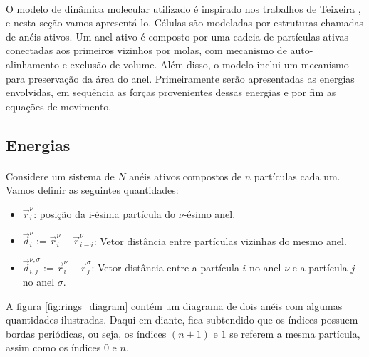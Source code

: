 \documentclass{article}
\theoremstyle{definition}
\def \quantity#1#2#3{\vec{#1}_{#2}^{#3}}
\def \quantityg#1#2#3#4#5{\vec{#1}_{#2, #3}^{#4, #5}}
\def \pos#1#2{\quantity{r}{#1}{#2}}
\def \desloc#1#2{\quantity{d}{#1}{#2}}
\begin{document}
\paragraph{}
O modelo de dinâmica molecular utilizado é inspirado nos trabalhos de Teixeira \cite{teixeira_single_2021}, \cite{teixeira_segregation_2024} e nesta seção vamos apresentá-lo. Células são modeladas por estruturas chamadas de anéis ativos. Um anel ativo é composto por uma cadeia de partículas ativas conectadas aos primeiros vizinhos por molas, com mecanismo de auto-alinhamento e exclusão de volume. Além disso, o modelo inclui um mecanismo para preservação da área do anel. Primeiramente serão apresentadas as energias envolvidas, em sequência as forças provenientes dessas energias e por fim as equações de movimento.

\subsection{Energias}
\paragraph{}
Considere um sistema de $N$ anéis ativos compostos de $n$ partículas cada um. Vamos definir as seguintes quantidades:

\begin{itemize}
    \item $\pos{i}{\nu}$: posição da i-ésima partícula do $\nu$-ésimo anel.
    \item $\desloc{i}{\nu} := \pos{i}{\nu} - \pos{i-i}{\nu}$: Vetor distância entre partículas vizinhas do mesmo anel.
    \item $\quantityg{d}{i}{j}{\nu}{\sigma} := \pos{i}{\nu} - \pos{j}{\sigma}$: Vetor distância entre a partícula $i$ no anel $\nu$ e a partícula $j$ no anel $\sigma$.
\end{itemize}
A figura \ref{fig:rings_diagram} contém um diagrama de dois anéis com algumas quantidades ilustradas. Daqui em diante, fica subtendido que os índices possuem bordas periódicas, ou seja, os índices $(n+1)$ e $1$ se referem a mesma partícula, assim como os índices $0$ e $n$.
\end{document}
